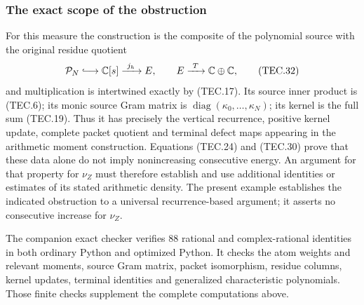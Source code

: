 \subsubsection{The exact scope of the obstruction}

For this measure the construction is the composite of the polynomial
source with the original residue quotient
\[
 \mathcal P_N\lhook\joinrel\longrightarrow\mathbb C[s]
       \xrightarrow{\ j_h\ } E,
 \qquad E\xrightarrow{\ T\ }\mathbb C\oplus\mathbb C,
                                                                    \tag{TEC.32}
\]
and multiplication is intertwined exactly by (TEC.17).  Its source
inner product is (TEC.6); its monic source Gram matrix is
\(\operatorname{diag}(\kappa_0,\ldots,\kappa_N)\); its kernel is
the full sum (TEC.19).  Thus it has precisely the vertical recurrence,
positive kernel update, complete packet quotient and terminal defect
maps appearing in the arithmetic moment construction.  Equations
(TEC.24) and (TEC.30) prove that these data alone do not imply
nonincreasing consecutive energy.  An argument for that property for
\(\nu_Z\) must therefore establish and use additional identities or
estimates of its stated arithmetic density.  The present example
establishes the indicated obstruction to a universal recurrence-based
argument; it asserts no consecutive increase for \(\nu_Z\).

The companion exact checker verifies 88 rational and complex-rational
identities in both ordinary Python and optimized Python.  It checks
the atom weights and relevant moments, source Gram matrix, packet
isomorphism, residue columns, kernel updates, terminal identities and
generalized characteristic polynomials.  Those finite checks
supplement the complete computations above.
